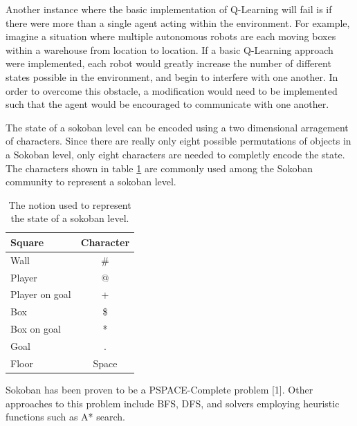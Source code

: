 \documentclass[times, 10pt,twocolumn]{article}
\begin{document}
Another instance where the basic implementation of Q-Learning will fail is if there were more than a single agent acting within the environment. For example, imagine a situation where multiple autonomous robots are each moving boxes within a warehouse from location to location. If a basic Q-Learning approach were implemented, each robot would greatly increase the number of different states possible in the environment, and begin to interfere with one another.  In order to overcome this obstacle, a modification would need to be implemented such that the agent would be encouraged to communicate with one another.


The state of a sokoban level can be encoded using a two dimensional arragement of characters. Since there are really only eight possible permutations of objects in a Sokoban level, only eight characters are needed to completly encode the state. The characters shown in table \ref{table:notation} are commonly used among the Sokoban community to represent a sokoban level.

\begin{table}[htbp]
  \centering
  \begin{tabular}{l c} \hline\hline
    Square & Character \\ \hline
    Wall & \# \\
    Player & @ \\
    Player on goal & + \\
    Box & \$ \\
    Box on goal & * \\
    Goal & . \\
    Floor & Space \\ \hline\hline
  \end{tabular}
  \caption{The notion used to represent the state of a sokoban level.}
  \label{table:notation}
\end{table}


Sokoban has been proven to be a PSPACE-Complete problem [1]. Other approaches to this problem include BFS, DFS, and solvers employing heuristic functions such as A* search.

\end{document}
